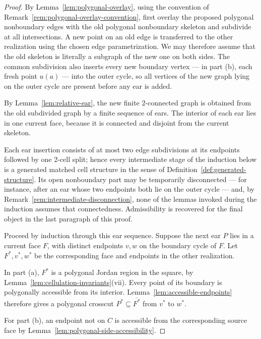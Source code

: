 \documentclass[11pt]{article}
\theoremstyle{mainplain}
\theoremstyle{mainroman}
\theoremstyle{definition}
\numberwithin{equation}{section}
\begin{document}
\begin{proof}
By Lemma~\ref{lem:polygonal-overlay}, using the convention of
Remark~\ref{rem:polygonal-overlay-convention}, first overlay the proposed
polygonal nonboundary edges with the old polygonal nonboundary skeleton
and subdivide at all intersections. A new point on an old edge is transferred to the other realization using the chosen edge parametrization. We may therefore assume that the old skeleton is literally a subgraph of the new one on both sides. The common subdivision also inserts every new boundary vertex --- in part (b), each fresh point \(u(a)\) --- into the outer cycle, so all vertices of the new graph lying on the outer cycle are present before any ear is added.

By Lemma~\ref{lem:relative-ear}, the new finite 2-connected graph is obtained from the old subdivided graph by a finite sequence of ears. The interior of each ear lies in one current face, because it is connected and disjoint from the current skeleton.

Each ear insertion consists of at most two edge subdivisions at its
endpoints followed by one 2-cell split; hence every intermediate stage
of the induction below is a generated matched cell structure in the
sense of Definition~\ref{def:generated-structure}. Its open
nonboundary part may be temporarily disconnected --- for instance,
after an ear whose two endpoints both lie on the outer cycle --- and,
by Remark~\ref{rem:intermediate-disconnection}, none of the lemmas
invoked during the induction assumes that connectedness. Admissibility
is recovered for the final object in the last paragraph of this proof.

Proceed by induction through this ear sequence. Suppose the next ear \(P\) lies in a current face \(F\), with distinct endpoints \(v,w\) on the boundary cycle of \(F\). Let \(F^\ast,v^\ast,w^\ast\) be the corresponding face and endpoints in the other realization.

In part (a), \(F^\ast\) is a polygonal Jordan region in the square, by
Lemma~\ref{lem:cellulation-invariants}\textup{(vii)}. Every point of its boundary is polygonally accessible from its interior. Lemma~\ref{lem:accessible-endpoints} therefore gives a polygonal crosscut \(P^\ast\subseteq\overline{F^\ast}\) from \(v^\ast\) to \(w^\ast\).

For part (b), an endpoint not on \(C\) is accessible from the corresponding source face by Lemma~\ref{lem:polygonal-side-accessibility}.


\end{proof}
\end{document}
